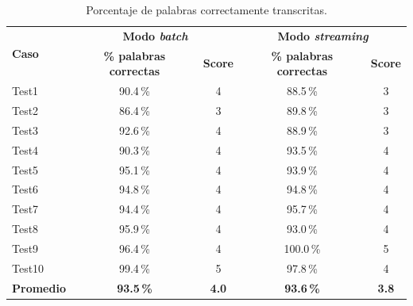 \begin{table}[htbp]
    \centering
    \caption{Porcentaje de palabras correctamente transcritas.}
    \label{tab:asr_scores_detalle}
    \begin{tabular}{@{}lcccc@{}}
    \toprule
    \multirow{2}{*}{\textbf{Caso}} & \multicolumn{2}{c}{\textbf{Modo \textit{batch}}} & \multicolumn{2}{c}{\textbf{Modo \textit{streaming}}} \\
    & \textbf{\% palabras correctas} & \textbf{Score} & \textbf{\% palabras correctas} & \textbf{Score} \\
    \midrule
    Test1  & 90.4\,\% & 4 & 88.5\,\%  & 3 \\
    Test2  & 86.4\,\% & 3 & 89.8\,\%  & 3 \\
    Test3  & 92.6\,\% & 4 & 88.9\,\%  & 3 \\
    Test4  & 90.3\,\% & 4 & 93.5\,\%  & 4 \\
    Test5  & 95.1\,\% & 4 & 93.9\,\%  & 4 \\
    Test6  & 94.8\,\% & 4 & 94.8\,\%  & 4 \\
    Test7  & 94.4\,\% & 4 & 95.7\,\%  & 4 \\
    Test8  & 95.9\,\% & 4 & 93.0\,\%  & 4 \\
    Test9  & 96.4\,\% & 4 & 100.0\,\% & 5 \\
    Test10 & 99.4\,\% & 5 & 97.8\,\%  & 4 \\
    \midrule
    \textbf{Promedio} & \textbf{93.5\,\%} & \textbf{4.0} & \textbf{93.6\,\%} & \textbf{3.8} \\
    \bottomrule
    \end{tabular}
\end{table}

